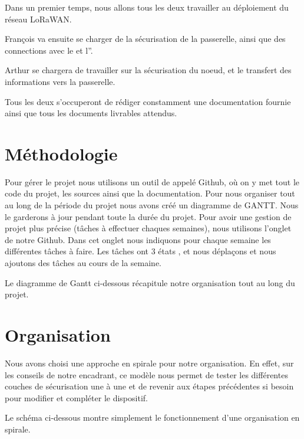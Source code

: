 \documentclass[letterpaper,10pt,french]{sphinxmanual}
\let\sphinxpxdimen\pdfpxdimen\else\newdimen\sphinxpxdimen
\begin{document}
Dans un premier temps, nous allons tous les deux travailler au déploiement du réseau LoRaWAN.

François va ensuite se charger de la sécurisation de la passerelle, ainsi que des connections avec le  et l”.

Arthur se chargera de travailler sur la sécurisation du noeud, et le transfert des informations vers la passerelle.

Tous les deux s’occuperont de rédiger constamment une documentation fournie ainsi que tous les documents livrables attendus.


\section{Méthodologie}
\label{\detokenize{repartitions:methodologie}}
Pour gérer le projet nous utilisons un outil de  appelé Github, où on y met tout le code du projet, les sources ainsi que la documentation. Pour nous organiser tout au long de la période du projet nous avons créé un diagramme de GANTT. Nous le garderons à jour pendant toute la durée du projet. Pour avoir une gestion de projet plus précise (tâches à effectuer chaques semaines), nous utilisons l’onglet  de notre  Github. Dans cet onglet nous indiquons pour chaque semaine les différentes tâches à faire. Les tâches ont 3 états ,  et  nous déplaçons et nous ajoutons des tâches au cours de la semaine.

Le diagramme de Gantt ci-dessous récapitule notre organisation tout au long du projet.

\noindent\sphinxincludegraphics[width=800\sphinxpxdimen]{{gantt}.png}


\section{Organisation}
\label{\detokenize{repartitions:organisation}}
Nous avons choisi une approche en spirale pour notre organisation. En effet, sur les conseils de notre encadrant, ce modèle nous permet de tester les différentes couches de sécurisation une à une et de revenir aux étapes précédentes si besoin pour modifier et compléter le dispositif.

Le schéma ci-dessous montre simplement le fonctionnement d’une organisation en spirale.
\end{document}
